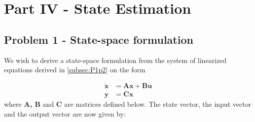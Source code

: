 \section{Part IV - State Estimation}\label{sec:part4}

\subsection{Problem 1 - State-space formulation}\label{subsec:P4p1}
We wish to derive a state-space formulation from the system of linearized equations derived in \ref{subsec:P1p2} on the form

\begin{equation}\label{eq:state-space}
\begin{split}
    \mathbf{\dot{x}} &= \mathbf{Ax + Bu}\\
    \mathbf{y} &= \mathbf{Cx}
\end{split}
\end{equation}
where \textbf{A, B} and \textbf{C} are matrices defined below. The state vector, the input vector and the output vector are now given by:

